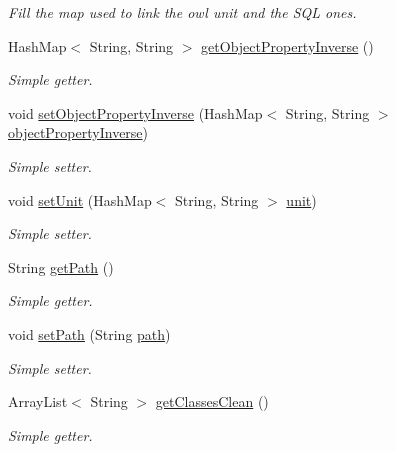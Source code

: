 \begin{DoxyCompactItemize}
\begin{DoxyCompactList}\small\item\em Fill the map used to link the owl unit and the SQL ones. \end{DoxyCompactList}\item 
HashMap$<$ String, String $>$ \hyperlink{class_data_base_1_1_tables_ae022cd96f6b78408704dcdfeb77c1ce4}{getObjectPropertyInverse} ()
\begin{DoxyCompactList}\small\item\em Simple getter. \end{DoxyCompactList}\item 
void \hyperlink{class_data_base_1_1_tables_ab7b2b1a4677f45c667d96dc78d90f75c}{setObjectPropertyInverse} (HashMap$<$ String, String $>$ \hyperlink{class_data_base_1_1_tables_a0465d81797980577fb423e6140df7110}{objectPropertyInverse})
\begin{DoxyCompactList}\small\item\em Simple setter. \end{DoxyCompactList}\item 
void \hyperlink{class_data_base_1_1_tables_aac3363f33a78dfb20c0b35d62f235466}{setUnit} (HashMap$<$ String, String $>$ \hyperlink{class_data_base_1_1_tables_a5f222e493ed4508b40f5fd8e50becaae}{unit})
\begin{DoxyCompactList}\small\item\em Simple setter. \end{DoxyCompactList}\item 
String \hyperlink{class_data_base_1_1_tables_a8a61618eb515452b8733444e53b81df0}{getPath} ()
\begin{DoxyCompactList}\small\item\em Simple getter. \end{DoxyCompactList}\item 
void \hyperlink{class_data_base_1_1_tables_a6aea1cbfa10e74a6685cff1f3d385ac2}{setPath} (String \hyperlink{class_data_base_1_1_tables_ae80958e71da9b7fc4bf4e138f377b59f}{path})
\begin{DoxyCompactList}\small\item\em Simple setter. \end{DoxyCompactList}\item 
ArrayList$<$ String $>$ \hyperlink{class_data_base_1_1_tables_a5702f3e8af3ff4bc84fc1ef41fa0e0a7}{getClassesClean} ()
\begin{DoxyCompactList}\small\item\em Simple getter. \end{DoxyCompactList}\item 

\end{DoxyCompactItemize}
